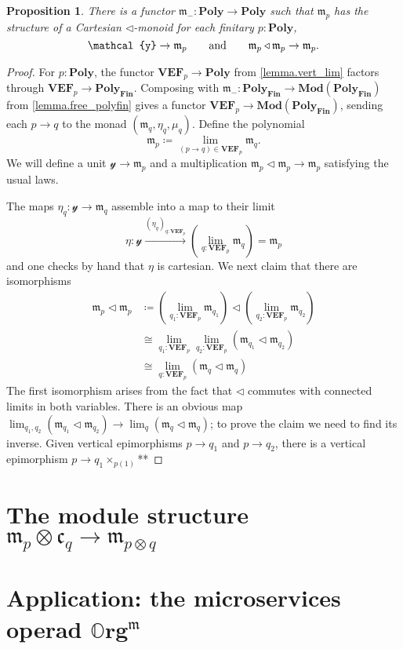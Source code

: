 \documentclass[11pt, one side, article]{memoir}
\theoremstyle{definition}
\theoremstyle{plain}
\newtheorem{proposition}[definitionx]{Proposition}
\newcommand{\Cat}[1]{\mathbf{#1}}%
\newcommand{\To}[2][]{\xrightarrow[#1]{#2}}
\newcommand{\finset}{\Cat{Fin}}
\newcommand{\oorg}{\mathbb{O}\Cat{rg}}
\newcommand{\polyfin}{\poly_{\finset}}
\newcommand{\Mod}{\Cat{Mod}}
\newcommand{\yon}{\mathcal{y}}
\newcommand{\poly}{\Cat{Poly}}
\newcommand{\tri}{\mathbin{\triangleleft}}
\newcommand{\free}{\mathfrak{m}}
\newcommand{\cofree}{\mathfrak{c}}
\newcommand{\VEF}{\Cat{VEF}}
\newcommand{\qqand}{\qquad\text{and}\qquad}
\begin{document}
\begin{proposition}
There is a functor $\free_-\colon\poly\to\poly$ such that $\free_p$ has the structure of a Cartesian $\tri$-monoid for each finitary $p:\poly$,
\[
\yon\to\free_p
\qqand
\free_p\tri\free_p\to\free_p.
\qedhere
\]
\end{proposition}
\begin{proof}
For $p:\poly$, the functor $\VEF_p\to\poly$ from \cref{lemma.vert_lim} factors through $\VEF_p\to\polyfin$. Composing with $\free_-\colon\polyfin\to\Mod(\polyfin)$ from \cref{lemma.free_polyfin} gives a functor $\VEF_p\to\Mod(\polyfin)$,
sending each $p\to q$ to the monad $(\free_q,\eta_q,\mu_q)$. Define the polynomial
\[\free_p\coloneqq\lim_{(p\to q)\in\VEF_p}\free_q.\]
We will define a unit $\yon\to\free_p$ and a multiplication $\free_p\tri\free_p\to\free_p$ satisfying the usual laws. 

The maps $\eta_q\colon\yon\to\free_q$ assemble into a map to their limit
\[
  \eta\colon\yon\To{(\eta_q)_{q:\VEF_p}}
  \left(\lim_{q:\VEF_p}\free_q\right)=
  \free_p
\]
and one checks by hand that $\eta$ is cartesian. We next claim that there are isomorphisms
\begin{align*}
	\free_p\tri\free_p&\coloneqq
  \left(\lim_{q_1:\VEF_p}\free_{q_1}\right)\tri\left(\lim_{q_2:\VEF_p}\free_{q_2}\right)\\&\cong
  \lim_{q_1:\VEF_p}\lim_{q_2:\VEF_p}(\free_{q_1}\tri\free_{q_2})\\&\cong
  \lim_{q:\VEF_p}(\free_q\tri\free_q)
\end{align*}
The first isomorphism arises from the fact that $\tri$ commutes with connected limits in both variables. There is an obvious map $\lim_{q_1,q_2}(\free_{q_1}\tri\free_{q_2})\to\lim_{q}(\free_q\tri\free_q)$; to prove the claim we need to find its inverse. Given vertical epimorphisms $p\to q_1$ and $p\to q_2$, there is a vertical epimorphism $p\to q_1\times_{p(1)}$**
\end{proof}

\chapter{The module structure $\free_p\otimes\cofree_q\to\free_{p\otimes q}$}

\chapter{Application: the microservices operad $\oorg^\free$}

\printbibliography
\end{document}
